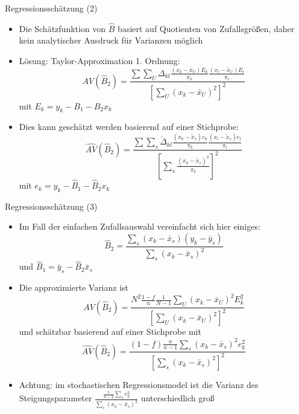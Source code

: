 \documentclass[9pt]{beamer}
\begin{document}
\begin{frame}{Regressionsschätzung (2)}
\begin{itemize}
	\item Die Schätzfunktion von $\hat{B}$ basiert auf Quotienten von Zufallsgrößen, daher kein analytischer Ausdruck für Varianzen möglich
	\item Lösung: Taylor-Approximation 1. Ordnung:
	$$AV(\hat{B}_2) = \frac{\sum\sum_U \Delta_{kl}\frac{(x_k - \bar{x}_U)E_k}{\pi_k}\frac{(x_l - \bar{x}_U)E_l}{\pi_l}}{\left[\sum_U (x_k - \bar{x}_U)^2\right]^{2}}$$ mit $E_k = y_k - B_1 - B_2 x_k$
	\item Dies kann geschätzt werden basierend auf einer Stichprobe:
		$$\hat{AV}(\hat{B}_2) = \frac{\sum\sum_s \check{\Delta}_{kl}\frac{(x_k - \tilde{x}_s)e_k}{\pi_k}\frac{(x_l - \tilde{x}_s)e_l}{\pi_l}}{\left[\sum_s \frac{(x_k - \tilde{x}_s)^2}{\pi_k}\right]^{2}}$$ mit $e_k = y_k - \hat{B}_1 - \hat{B}_2 x_k$
\end{itemize}
\end{frame}

\begin{frame}{Regressionsschätzung (3)}
\begin{itemize}
	\item Im Fall der einfachen Zufallsauswahl vereinfacht sich hier einiges:
	$$\hat{B}_2 = \frac{\sum_s (x_k -\bar{x}_s)(y_k - \bar{y}_s)}{\sum_s (x_k - \bar{x}_s)^2}$$ und $\hat{B}_1 = \bar{y}_s - \hat{B}_2 \bar{x}_s$
	\item Die approximierte Varianz ist
	$$AV(\hat{B}_2) = \frac{N^2\frac{1-f}{n}\frac{1}{N-1}\sum_U (x_k - \bar{x}_U)^2 E_k^2}{[\sum_U (x_k - \bar{x}_U)^2]^2}$$
	und schätzbar basierend auf einer Stichprobe mit
	$$\hat{AV}(\hat{B}_2) = \frac{(1-f)\frac{n}{n-1}\sum_s (x_k - \bar{x}_s)^2 e_k^2}{[\sum_s (x_k - \bar{x}_s)^2]^2}$$
	\item Achtung: im stochastischen Regressionsmodel ist die Varianz des Steigungsparameter $\frac{\frac{1}{n-2}\sum_s e_k^2}{\sum_s (x_k - \bar{x}_s)^2}$ unterschiedlich groß
\end{itemize}
\end{frame}
\end{document}
